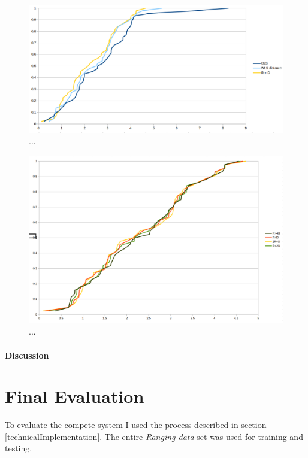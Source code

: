 \begin{figure}[htp]

\label{fig:SVM}
\centering
\includegraphics[width=\textwidth]{Figures/Weighting3.png}
\decoRule
\caption[...]{...}

\end{figure}
\begin{figure}[htp]

\label{fig:SVM}
\centering
\includegraphics[width=\textwidth]{Figures/Weighting4.png}
\decoRule
\caption[...]{...}

\end{figure}

\paragraph{Discussion}

\section{Final Evaluation}

To evaluate the compete system I used the process described in section \ref{technicalImplementation}. The entire \emph{Ranging data} set was used for training and testing.

